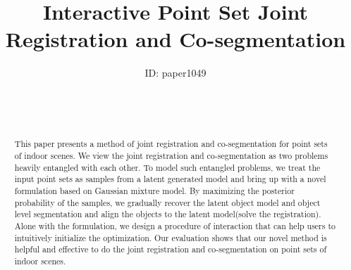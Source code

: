 

\title[Interactive Point Set Joint Registration and Co-segmentation]%
      {Interactive Point Set Joint Registration and Co-segmentation}

\author[Siyu Hu]
{\parbox{\textwidth}{\centering ID: paper1049}
        \\
{\parbox{\textwidth}{\centering \\
       } 
}
}

%





\maketitle
\begin{abstract}
This paper presents a method of joint registration and co-segmentation for point sets of indoor scenes. We view the joint registration and co-segmentation as two problems heavily entangled with each other. To model such entangled problems, we treat the input point sets as samples from a latent generated model and bring up with a novel formulation based on Gaussian mixture model. By maximizing the posterior probability of the samples, we gradually recover the latent object model and object level segmentation and align the objects to the latent model(solve the registration). Alone with the formulation, we design a procedure of interaction that can help users to intuitively initialize the optimization. Our evaluation shows that our novel method is helpful and effective to do the joint registration and co-segmentation on point sets of indoor scenes.    
\begin{classification} %
\end{classification}

\end{abstract}

